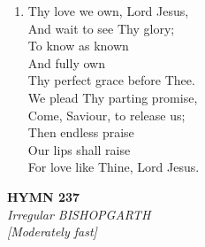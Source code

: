 \documentclass[11pt,a4paper]{article}
\begin{document}
\begin{enumerate}
    \item Thy love we own, Lord Jesus, \\
        And wait to see Thy glory; \\
            To know as known \\
            And fully own \\
        Thy perfect grace before Thee. \\
        We plead Thy parting promise, \\
        Come, Saviour, to release us; \\
            Then endless praise \\
            Our lips shall raise \\
        For love like Thine, Lord Jesus.

\end{enumerate}

\newpage
\begin{center}
    {\Large \textbf{HYMN 237}}
    \\
    \textit{Irregular BISHOPGARTH}
    \\
    \textit{\small [Moderately fast]}
\end{center}
\vspace{1em}
\end{document}
